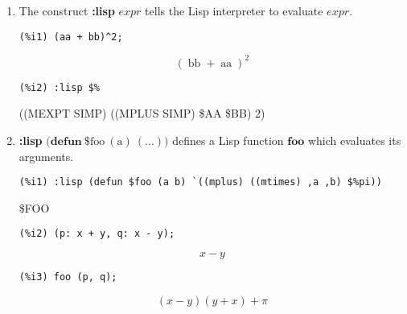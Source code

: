 \documentclass[12pt,leqno]{article}
\begin{document}
\begin{enumerate}

\item The construct {\bf :lisp} $\mathit{expr}$ tells the Lisp interpreter
to evaluate $\mathit{expr}$.
\begin{verbatim}
(%i1) (aa + bb)^2;
\end{verbatim}
\begin{dmath}[number={\(\mathop{\mathrm{\%o}_{1}}\)}]
{\left(\mathop{\mathrm{bb}}+\mathop{\mathrm{aa}}\right)}^{2}
\end{dmath}
\begin{verbatim}
(%i2) :lisp $%
\end{verbatim}
((MEXPT SIMP) ((MPLUS SIMP) \$AA \$BB) 2)


\item {\bf :lisp} $\mathrm{(}\mathbf{defun\ } \mathrm{\$foo\ (a)\ (\ldots))}$
defines a Lisp function $\mathbf{foo}$ which evaluates its arguments.
\begin{verbatim}
(%i1) :lisp (defun $foo (a b) `((mplus) ((mtimes) ,a ,b) $%pi))
\end{verbatim}
\$FOO
\begin{verbatim}
(%i2) (p: x + y, q: x - y);
\end{verbatim}
\begin{dmath}[number={\(\mathop{\mathrm{\%o}_{2}}\)}]
x-y
\end{dmath}
\begin{verbatim}
(%i3) foo (p, q);
\end{verbatim}
\begin{dmath}[number={\(\mathop{\mathrm{\%o}_{3}}\)}]
\left(x-y\right) \left(y+x\right)+\pi
\end{dmath}



\end{enumerate}
\end{document}
